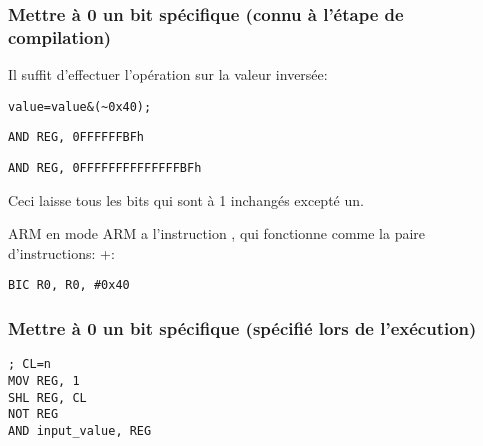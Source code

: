 \subsubsection{Mettre à 0 un bit spécifique (connu à l'étape de compilation)}

Il suffit d'effectuer l'opération \AND sur la valeur inversée:

\begin{lstlisting}[caption=\CCpp,style=customc]
value=value&(~0x40);
\end{lstlisting}

\begin{lstlisting}[caption=x86,style=customasmx86]
AND REG, 0FFFFFFBFh
\end{lstlisting}

\begin{lstlisting}[caption=x64,style=customasmx86]
AND REG, 0FFFFFFFFFFFFFFBFh
\end{lstlisting}

Ceci laisse tous les bits qui sont à 1 inchangés excepté un.


ARM en mode ARM a l'instruction \BIC, qui fonctionne comme la paire d'instructions:
\NOT+\AND:

\begin{lstlisting}[caption=ARM (\ARMMode),style=customasmARM]
BIC R0, R0, #0x40
\end{lstlisting}

\subsubsection{
Mettre à 0 un bit spécifique (spécifié lors de l'exécution)}



\begin{lstlisting}[caption=x86,style=customasmx86]
; CL=n
MOV REG, 1
SHL REG, CL
NOT REG
AND input_value, REG
\end{lstlisting}
